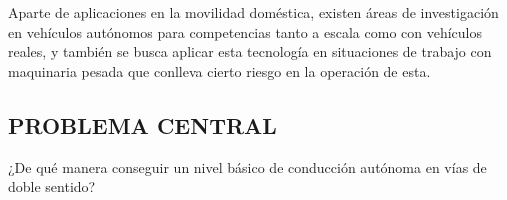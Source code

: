 Aparte de aplicaciones en la movilidad doméstica, existen áreas de investigación en vehículos autónomos para competencias tanto a escala como con vehículos reales, y también se busca aplicar esta tecnología en situaciones de trabajo con maquinaria pesada que conlleva cierto riesgo en la operación de esta.

\subsection{PROBLEMA CENTRAL}
¿De qué manera conseguir un nivel básico de conducción autónoma en vías de doble sentido?

